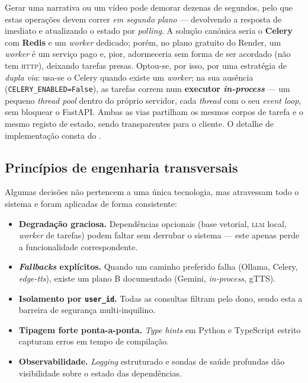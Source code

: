 Gerar uma narrativa ou um vídeo pode demorar dezenas de segundos, pelo
que estas operações devem correr \emph{em segundo plano} — devolvendo a
resposta de imediato e atualizando o estado por \emph{polling}. A solução
canónica seria o \textbf{Celery} com \textbf{Redis} e um \emph{worker}
dedicado; porém, no plano gratuito do Render, um \emph{worker} é um
serviço pago e, pior, adormeceria sem forma de ser acordado (não tem
\textsc{http}), deixando tarefas presas. Optou-se, por isso, por uma
estratégia de \emph{dupla via}: usa-se o Celery quando existe um
\emph{worker}; na sua ausência (\texttt{CELERY\_ENABLED=False}), as
tarefas correm num \textbf{executor \emph{in-process}} — um pequeno
\emph{thread pool} dentro do próprio servidor, cada \emph{thread} com o
seu \emph{event loop}, sem bloquear o FastAPI. Ambas as vias partilham os
mesmos corpos de tarefa e o mesmo registo de estado, sendo transparentes
para o cliente. O detalhe de implementação consta do
.

\subsection{Princípios de engenharia transversais}
\label{sub:principios}

Algumas decisões não pertencem a uma única tecnologia, mas atravessam todo
o sistema e foram aplicadas de forma consistente:

\begin{itemize}[leftmargin=*]
  \item \textbf{Degradação graciosa.} Dependências opcionais (base
  vetorial, \textsc{llm} local, \emph{worker} de tarefas) podem faltar sem
  derrubar o sistema — este apenas perde a funcionalidade correspondente.
  \item \textbf{\emph{Fallbacks} explícitos.} Quando um caminho preferido
  falha (Ollama, Celery, \emph{edge-tts}), existe um plano B documentado
  (Gemini, \emph{in-process}, gTTS).
  \item \textbf{Isolamento por \texttt{user\_id}.} Todas as consultas
  filtram pelo dono, sendo esta a barreira de segurança multi-inquilino.
  \item \textbf{Tipagem forte ponta-a-ponta.} \emph{Type hints} em Python e
  TypeScript estrito capturam erros em tempo de compilação.
  \item \textbf{Observabilidade.} \emph{Logging} estruturado e sondas de
  saúde profundas dão visibilidade sobre o estado das dependências.
\end{itemize}
